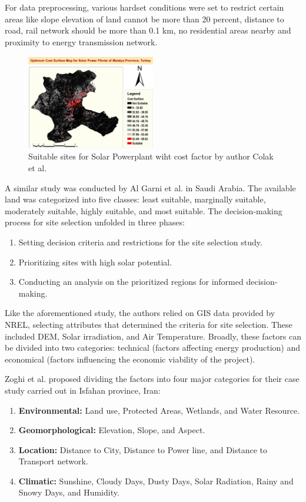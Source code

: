 \documentclass[a4paper,12pt]{Classes/RoboticsLaTeX}
\begin{document}
	For data preprocessing, various hardset conditions were set to restrict certain areas like slope elevation of land cannot be more than 20 percent,
	distance to road, rail network should be more than 0.1 km, no residential areas nearby and proximity to energy transmission network.

	\begin{figure}[H]
		\centering
		\includegraphics[width=0.5\textwidth]{Figures/Colak.png} %
		\caption{Suitable sites for Solar Powerplant wiht cost factor by author Colak et al.\cite{colak2020}}
		\label{fig:my_label} %
	\end{figure}

	A similar study was conducted by Al Garni et al. in Saudi Arabia\cite{garni2017}. The available land was categorized into five classes: least suitable, marginally suitable, 
	moderately suitable, highly suitable, and most suitable. The decision-making process for site selection unfolded in three phases:
	\begin{enumerate}
		\item Setting decision criteria and restrictions for the site selection study.
		\item Prioritizing sites with high solar potential.
		\item Conducting an analysis on the prioritized regions for informed decision-making.
	\end{enumerate}

	Like the aforementioned study, the authors relied on GIS data provided by NREL, selecting attributes that determined the criteria for site selection. 
	These included DEM, Solar irradiation, and Air Temperature. Broadly, these factors can be divided into two categories: technical (factors affecting energy production) 
	and economical (factors influencing the economic viability of the project).

	Zoghi et al. proposed dividing the factors into four major categories for their case study carried out in Isfahan province, Iran\cite{zoghi2017}:
	\begin{enumerate}
		\item \textbf{Environmental:} Land use, Protected Areas, Wetlands, and Water Resource.
		\item \textbf{Geomorphological:} Elevation, Slope, and Aspect.
		\item \textbf{Location:} Distance to City, Distance to Power line, and Distance to Transport network.
		\item \textbf{Climatic:} Sunshine, Cloudy Days, Dusty Days, Solar Radiation, Rainy and Snowy Days, and Humidity.
	\end{enumerate}
\end{document}
